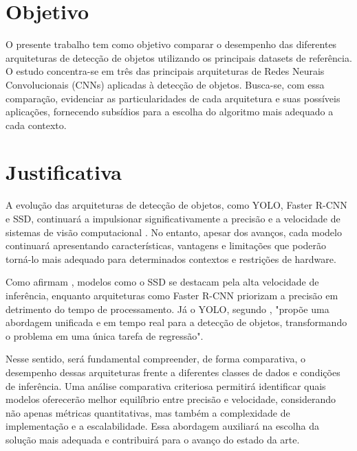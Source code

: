 \section{Objetivo}

O presente trabalho tem como objetivo comparar o desempenho das diferentes arquiteturas de 
detecção de objetos utilizando os principais datasets de referência. O estudo concentra-se 
em três das principais arquiteturas de Redes Neurais Convolucionais (CNNs) aplicadas à 
detecção de objetos. Busca-se, com essa comparação, evidenciar as particularidades de cada 
arquitetura e suas possíveis aplicações, fornecendo subsídios para a escolha do algoritmo 
mais adequado a cada contexto.

\section{Justificativa}

A evolução das arquiteturas de detecção de objetos, como YOLO, Faster R-CNN e SSD, continuará
a impulsionar significativamente a precisão e a velocidade de sistemas de visão computacional
\cite{redmon2016yolo, ren2017faster, liu2016ssd, tan2020efficientdet, lin2020focal}. No
entanto, apesar dos avanços, cada modelo continuará apresentando características, vantagens e
limitações que poderão torná-lo mais adequado para determinados contextos e restrições de
hardware.

Como afirmam , modelos como o SSD se destacam pela alta velocidade de
inferência, enquanto arquiteturas como Faster R-CNN \cite{ren2017faster} priorizam a precisão
em detrimento do tempo de processamento. Já o YOLO, segundo ,
"propõe uma abordagem unificada e em tempo real para a detecção de objetos, transformando o
problema em uma única tarefa de regressão".

Nesse sentido, será fundamental compreender, de forma comparativa, o desempenho dessas
arquiteturas frente a diferentes classes de dados e condições de inferência. Uma análise
comparativa criteriosa permitirá identificar quais modelos oferecerão melhor equilíbrio entre
precisão e velocidade, considerando não apenas métricas quantitativas, mas também a
complexidade de implementação e a escalabilidade. Essa abordagem auxiliará na escolha da
solução mais adequada e contribuirá para o avanço do estado da arte.
